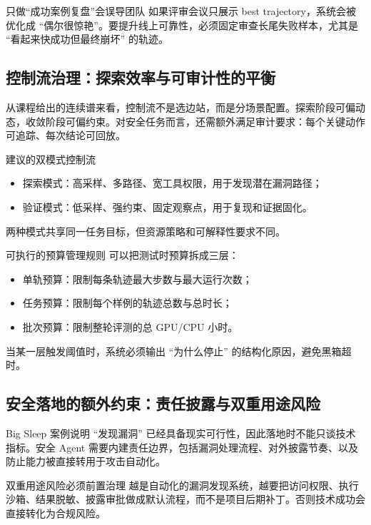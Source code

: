 \documentclass[a4paper]{article}
\begin{document}
\begin{warningbox}{只做“成功案例复盘”会误导团队}
如果评审会议只展示 best trajectory，系统会被优化成 ``偶尔很惊艳''。要提升线上可靠性，必须固定审查长尾失败样本，尤其是 ``看起来快成功但最终崩坏'' 的轨迹。
\end{warningbox}

\subsection{控制流治理：探索效率与可审计性的平衡}
从课程给出的连续谱来看，控制流不是选边站，而是分场景配置。探索阶段可偏动态，收敛阶段可偏约束。对安全任务而言，还需额外满足审计要求：每个关键动作可追踪、每次结论可回放。

\begin{importantbox}{建议的双模式控制流}
\begin{itemize}
    \item 探索模式：高采样、多路径、宽工具权限，用于发现潜在漏洞路径；
    \item 验证模式：低采样、强约束、固定观察点，用于复现和证据固化。
\end{itemize}
两种模式共享同一任务目标，但资源策略和可解释性要求不同。
\end{importantbox}

\begin{knowledgebox}{可执行的预算管理规则}
可以把测试时预算拆成三层：
\begin{itemize}
    \item 单轨预算：限制每条轨迹最大步数与最大运行次数；
    \item 任务预算：限制每个样例的轨迹总数与总时长；
    \item 批次预算：限制整轮评测的总 GPU/CPU 小时。
\end{itemize}
当某一层触发阈值时，系统必须输出 ``为什么停止'' 的结构化原因，避免黑箱超时。
\end{knowledgebox}

\subsection{安全落地的额外约束：责任披露与双重用途风险}
Big Sleep 案例说明 ``发现漏洞'' 已经具备现实可行性，因此落地时不能只谈技术指标。安全 Agent 需要内建责任边界，包括漏洞处理流程、对外披露节奏、以及防止能力被直接转用于攻击自动化。

\begin{warningbox}{双重用途风险必须前置治理}
越是自动化的漏洞发现系统，越要把访问权限、执行沙箱、结果脱敏、披露审批做成默认流程，而不是项目后期补丁。否则技术成功会直接转化为合规风险。
\end{warningbox}
\end{document}
